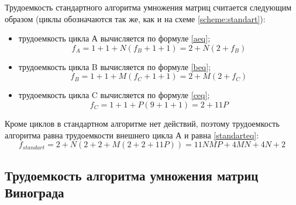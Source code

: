 Трудоемкость стандартного алгоритма умножения матриц считается следующим
образом (циклы обозначаются так же, как и на схеме \ref{scheme:standart}):
\begin{itemize}[left=\parindent]
    \item трудоемкость цикла А вычисляется по формуле \ref{aeq};
        \begin{equation}\label{aeq}
            f_A = 1 + 1 + N(f_B + 1 + 1) = 2 + N(2 + f_B)
        \end{equation}
    \item трудоемкость цикла B вычисляется по формуле \ref{beq};
        \begin{equation}\label{beq}
            f_B = 1 + 1 + M(f_C + 1 + 1) = 2 + M(2 + f_C)
        \end{equation}
    \item трудоемкость цикла C вычисляется по формуле \ref{ceq};
        \begin{equation}\label{ceq}
            f_C = 1 + 1 + P(9 + 1 + 1) = 2 + 11P
        \end{equation}
\end{itemize}

Кроме циклов в стандартном алгоритме нет действий, поэтому трудоемкость
алгоритма равна трудоемкости внешнего цикла А и равна \ref{standarteq}:
    \begin{equation}\label{standarteq}
        f_{standart} = 2 + N(2 + 2 + M(2 + 2 + 11P)) = 11NMP + 4MN + 4N + 2 
    \end{equation}


\subsection{Трудоемкость алгоритма умножения матриц Винограда}

